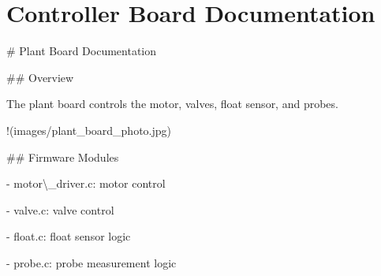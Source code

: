 \chapter{Controller Board Documentation }
\hypertarget{index}{}\label{index}
\label{index_md__controller__integrated__doxy_2docs_2controller__mainpage}%
%
 \# Plant Board Documentation

\#\# Overview

The plant board controls the motor, valves, float sensor, and probes.

!\+(images/\+plant\+\_\+board\+\_\+photo.\+jpg)

\#\# Firmware Modules

-\/ {\ttfamily motor\textbackslash{}\+\_\+driver.\+c}:\+ motor control

-\/ {\ttfamily valve.\+c}:\+ valve control

-\/ {\ttfamily float.\+c}:\+ float sensor logic

-\/ {\ttfamily probe.\+c}:\+ probe measurement logic 